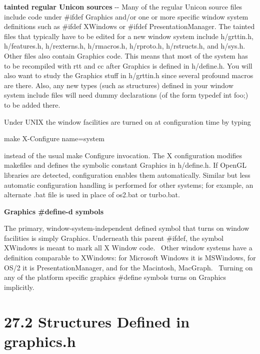 \textbf{tainted {\textquotedbl}regular{\textquotedbl} Unicon sources}
-{}- Many of the regular Unicon source files include code under
\textsf{\#ifdef Graphics} and/or one or more specific window system
definitions such as \textsf{\#ifdef XWindows} or \textsf{\#ifdef
PresentationManager}. The tainted files that typically have to be
edited for a new window system include \textsf{h/grttin.h},
\textsf{h/features.h}, \textsf{h/rexterns.h}, \textsf{h/rmacros.h},
\textsf{h/rproto.h}, \textsf{h/rstructs.h}, and
\textsf{h/sys.h}. Other files also contain \textsf{Graphics}
code. This means that most of the system has to be recompiled with rtt
and cc after \textsf{Graphics} is defined in \textsf{h/define.h}. You
will also want to study the \textsf{Graphics} stuff in
\textsf{h/grttin.h} since several profound macros are there. Also, any
new types (such as structures) defined in your window system include
files will need dummy declarations (of the form \textsf{typedef int
foo;}) to be added there.

Under UNIX the window facilities are turned on at configuration time by typing

\textsf{make X-Configure name=system}

\noindent instead of the usual \textsf{make Configure} invocation. The
X configuration modifies makefiles and defines the symbolic constant
\textsf{Graphics} in \textsf{h/define.h}. If OpenGL libraries are
detected, configuration enables them automatically. Similar but less
automatic configuration handling is performed for other systems; for
example, an alternate .\textsf{bat} file is used in place of
\textsf{os2.bat} or \textsf{turbo.bat}.

{\sffamily
\textbf{Graphics \#define{}-d symbols}}

The primary, window-system-independent defined symbol that turns on
window facilities is simply \textsf{Graphics}.  Underneath this parent
\textsf{\#ifdef}, the symbol \textsf{XWindows} is meant to mark all X
Window code. \ Other window systems have a definition comparable to
\textsf{XWindows}: for Microsoft Windows it is \textsf{MSWindows}, for
OS/2 it is \textsf{PresentationManager}, and for the Macintosh,
\textsf{MacGraph}. \ Turning on any of the platform specific graphics
\textsf{\#define} symbols turns on \textsf{Graphics} implicitly.

\section[27.2 Structures Defined in graphics.h]{27.2 Structures Defined in graphics.h}

